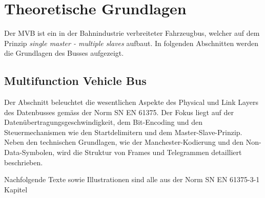



\chapter{Theoretische Grundlagen} %
\label{Chapter2TheoretischeGrundlagen} %
Der MVB ist ein in der Bahnindustrie verbreiteter Fahrzeugbus, welcher auf dem Prinzip \textit{single master - multiple slaves} aufbaut. In folgenden Abschnitten werden die Grundlagen des Busses aufgezeigt.


\section{Multifunction Vehicle Bus}


Der Abschnitt beleuchtet die wesentlichen Aspekte des Physical und Link Layers des Datenbusses gemäss der Norm SN EN 61375. Der Fokus liegt auf der Datenübertragungsgeschwindigkeit, dem Bit-Encoding und den Steuermechanismen wie den Startdelimitern und dem Master-Slave-Prinzip. Neben den technischen Grundlagen, wie der Manchester-Kodierung und den Non-Data-Symbolen, wird die Struktur von Frames und Telegrammen detailliert beschrieben.

Nachfolgende Texte sowie Illustrationen sind alle aus der Norm SN EN 61375-3-1 Kapitel 



